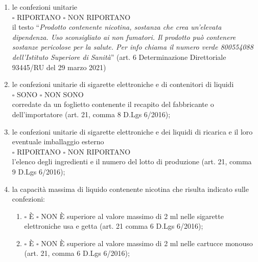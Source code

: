 \documentclass[12pt]{article}
\begin{document}
\begin{enumerate}
    \item le confezioni unitarie \\
    \begin{math}\square\end{math} RIPORTANO \begin{math}\square\end{math} NON RIPORTANO\\
    il testo “\textit{Prodotto contenente nicotina, sostanza che crea un'elevata dipendenza. Uso sconsigliato ai non fumatori. Il prodotto può contenere sostanze pericolose per la salute. Per info chiama il numero verde 800554088 dell’Istituto Superiore di Sanità}” (art. 6 Determinazione Direttoriale 93445/RU del 29 marzo 2021)
    \item le confezioni unitarie di sigarette elettroniche e di contenitori di liquidi \\
    \begin{math}\square\end{math} SONO \begin{math}\square\end{math} NON SONO\\ corredate da un foglietto contenente il recapito del fabbricante o dell’importatore (art. 21, comma 8 D.Lgs 6/2016);
    \item le confezioni unitarie di sigarette elettroniche e dei liquidi di ricarica e il loro eventuale imballaggio esterno\\
    \begin{math}\square\end{math} RIPORTANO \begin{math}\square\end{math} NON RIPORTANO\\
    l'elenco degli ingredienti e il numero del lotto di produzione (art. 21, comma 9 D.Lgs 6/2016);
    \item la capacità massima di liquido contenente nicotina che risulta indicato sulle confezioni:
    \begin{enumerate}
        \item \begin{math}\square\end{math} È \begin{math}\square\end{math} NON È superiore al valore massimo di 2 ml nelle sigarette elettroniche usa e getta (art. 21 comma 6 D.Lgs 6/2016);
        \item \begin{math}\square\end{math} È \begin{math}\square\end{math} NON È superiore al valore massimo di 2 ml nelle cartucce monouso (art. 21, comma 6 D.Lgs 6/2016);

\end{enumerate}
\end{enumerate}
\end{document}
